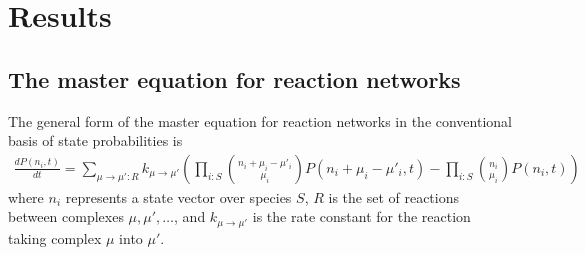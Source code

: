 \section{Results}\label{sec:results}

\subsection{The master equation for reaction networks}
The general form of the master equation for reaction networks in the conventional basis of state probabilities is
\begin{align*}
\frac{d P(n_i,t)}{dt} = \sum_{\mu \rightarrow \mu' \colon R} k_{\mu \rightarrow \mu'} \left(\prod_{i \colon S} \binom{n_i + \mu_i - \mu'_i}{\mu_i} P(n_i + \mu_i - \mu'_i,t) - \prod_{i \colon S} \binom{n_i}{\mu_i} P(n_i,t) \right)
\end{align*}
where $n_i$ represents a state vector over species $S$, $R$ is the set of reactions between complexes $\mu, \mu', \ldots$, and $k_{\mu \rightarrow \mu'}$ is the rate constant for the reaction taking complex $\mu$ into $\mu'$.

